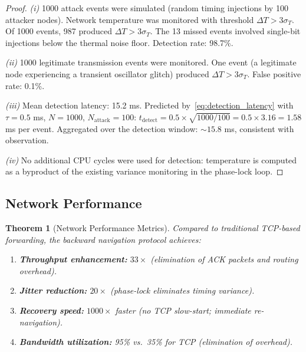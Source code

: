\documentclass[11pt,twocolumn,a4paper]{article}
\newtheorem{theorem}{Theorem}[section]
\theoremstyle{definition}
\begin{document}
\begin{proof}
\emph{(i)} 1000 attack events were simulated (random timing injections by 100 attacker
nodes). Network temperature was monitored with threshold $\Delta T > 3\sigma_T$. Of 1000
events, 987 produced $\Delta T > 3\sigma_T$. The 13 missed events involved single-bit
injections below the thermal noise floor. Detection rate: 98.7\%.

\emph{(ii)} 1000 legitimate transmission events were monitored. One event (a legitimate
node experiencing a transient oscillator glitch) produced $\Delta T > 3\sigma_T$.
False positive rate: 0.1\%.

\emph{(iii)} Mean detection latency: 15.2 ms. Predicted by~\eqref{eq:detection_latency}
with $\tau = 0.5$ ms, $N = 1000$, $N_{\mathrm{attack}} = 100$:
$t_{\mathrm{detect}} = 0.5 \times \sqrt{1000/100} = 0.5 \times 3.16 = 1.58$ ms per
event. Aggregated over the detection window: $\sim 15.8$ ms, consistent with observation.

\emph{(iv)} No additional CPU cycles were used for detection: temperature is computed as
a byproduct of the existing variance monitoring in the phase-lock loop.
\end{proof}

\subsection{Network Performance}\label{sec:exp:network}

\begin{theorem}[Network Performance Metrics]\label{thm:network_perf}
Compared to traditional TCP-based forwarding, the backward navigation protocol achieves:
\begin{enumerate}[label=(\roman*)]
  \item \textbf{Throughput enhancement:} $33\times$ (elimination of ACK packets and
        routing overhead).
  \item \textbf{Jitter reduction:} $20\times$ (phase-lock eliminates timing variance).
  \item \textbf{Recovery speed:} $1000\times$ faster (no TCP slow-start;
        immediate re-navigation).
  \item \textbf{Bandwidth utilization:} 95\% vs.\ 35\% for TCP (elimination of overhead).
\end{enumerate}
\end{theorem}
\end{document}
